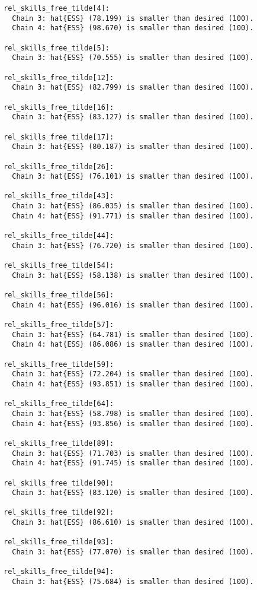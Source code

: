 \documentclass[
  letterpaper,
  DIV=11,
  numbers=noendperiod]{scrartcl}
\begin{document}
\begin{verbatim}
rel_skills_free_tilde[4]:
  Chain 3: hat{ESS} (78.199) is smaller than desired (100).
  Chain 4: hat{ESS} (98.670) is smaller than desired (100).

rel_skills_free_tilde[5]:
  Chain 3: hat{ESS} (70.555) is smaller than desired (100).

rel_skills_free_tilde[12]:
  Chain 3: hat{ESS} (82.799) is smaller than desired (100).

rel_skills_free_tilde[16]:
  Chain 3: hat{ESS} (83.127) is smaller than desired (100).

rel_skills_free_tilde[17]:
  Chain 3: hat{ESS} (80.187) is smaller than desired (100).

rel_skills_free_tilde[26]:
  Chain 3: hat{ESS} (76.101) is smaller than desired (100).

rel_skills_free_tilde[43]:
  Chain 3: hat{ESS} (86.035) is smaller than desired (100).
  Chain 4: hat{ESS} (91.771) is smaller than desired (100).

rel_skills_free_tilde[44]:
  Chain 3: hat{ESS} (76.720) is smaller than desired (100).

rel_skills_free_tilde[54]:
  Chain 3: hat{ESS} (58.138) is smaller than desired (100).

rel_skills_free_tilde[56]:
  Chain 4: hat{ESS} (96.016) is smaller than desired (100).

rel_skills_free_tilde[57]:
  Chain 3: hat{ESS} (64.781) is smaller than desired (100).
  Chain 4: hat{ESS} (86.086) is smaller than desired (100).

rel_skills_free_tilde[59]:
  Chain 3: hat{ESS} (72.204) is smaller than desired (100).
  Chain 4: hat{ESS} (93.851) is smaller than desired (100).

rel_skills_free_tilde[64]:
  Chain 3: hat{ESS} (58.798) is smaller than desired (100).
  Chain 4: hat{ESS} (93.856) is smaller than desired (100).

rel_skills_free_tilde[89]:
  Chain 3: hat{ESS} (71.703) is smaller than desired (100).
  Chain 4: hat{ESS} (91.745) is smaller than desired (100).

rel_skills_free_tilde[90]:
  Chain 3: hat{ESS} (83.120) is smaller than desired (100).

rel_skills_free_tilde[92]:
  Chain 3: hat{ESS} (86.610) is smaller than desired (100).

rel_skills_free_tilde[93]:
  Chain 3: hat{ESS} (77.070) is smaller than desired (100).

rel_skills_free_tilde[94]:
  Chain 3: hat{ESS} (75.684) is smaller than desired (100).


\end{verbatim}
\end{document}
